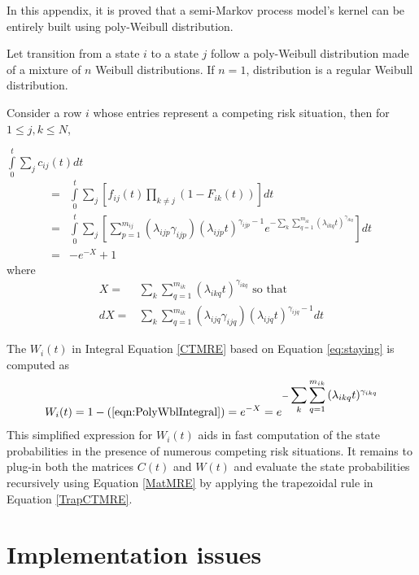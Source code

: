 In this appendix, it is proved that a semi-Markov process model's kernel can be
entirely built using poly-Weibull distribution.

Let transition from a state $i$ to a state $j$ follow a poly-Weibull distribution
made of a mixture of $n$ Weibull distributions. If $n=1$, distribution
is a regular Weibull distribution. 


Consider a row $i$ whose entries represent  a competing risk situation, then for $1 \le j,k \le N$,


$\int\limits_0^t {\displaystyle\sum\limits_j {c_{ij} (t)dt} }$
\begin{align}
=& \int\limits_0^t{\sum\limits_j {[f_{ij}(t)\prod\limits_{k\ne j}{(1-F_{ik}(t))}]} dt} \nonumber \\
=&\int\limits_0^t {\sum\limits_j{[ \displaystyle\sum_{p=1}^{m_{ij}}(\lambda_{ijp} \gamma_{ijp}) (\lambda_{ijp}t)^{\gamma_{ijp}-1} e^{-\displaystyle\sum\limits_{k}\sum\limits_{q=1}^{m_{ik}}{(\lambda_{ikq}t)^{\gamma_{ikq}}}}   ]} dt} \nonumber \\
=&-e^{-X} + 1
\label{eqn:PolyWblIntegral}
\end{align}
where
\begin{align}
X =& \sum_{k}\sum_{q=1}^{m_{ik}}{(\lambda_{ikq}t)^{\gamma_{ikq}}}  \text{ so that} \nonumber \\
dX =& \sum_k\displaystyle\sum_{q=1}^{m_{ik}}(\lambda_{ijq} \gamma_{ijq}) (\lambda_{ijq}t)^{\gamma_{ijq}-1}dt \nonumber
\end{align}

The $W_i(t)$ in Integral Equation \ref{CTMRE} based on Equation \ref{eq:staying} is computed as
\begin{align}
W_i(t) = 1-(\ref{eqn:PolyWblIntegral})  = e^{-X} = e^{-\displaystyle\sum_{k}\sum_{q=1}^{m_{ik}}{(\lambda_{ikq}t)^{\gamma_{ikq}}}}
\label{eq:PolyWblStaying}
\end{align}
This simplified expression for $W_i(t)$ aids in fast computation of the state probabilities in the presence of
numerous competing risk situations.
It remains to plug-in both the matrices $C(t)$ and $W(t)$ and evaluate the state probabilities
recursively using Equation \ref{MatMRE} by applying the trapezoidal rule in Equation \ref{TrapCTMRE}.



\section{Implementation issues}
\label{sec:PipingImplementation}


